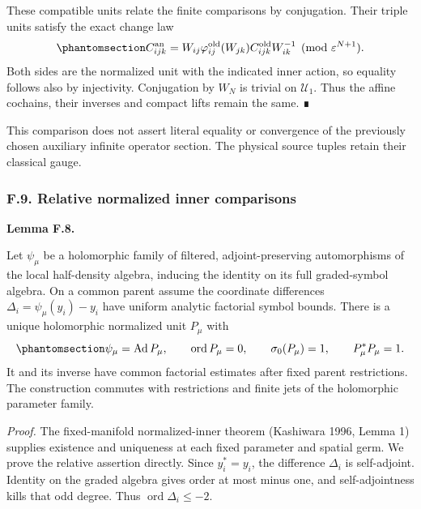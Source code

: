 \documentclass[
  english,
  11pt,
  reqno]{amsart}
\makeatletter
\newcommand{\pandocstatementheading}[1]{%
  \par\addpenalty{\@beginparpenalty}%
  \addvspace{.5\baselineskip plus .2\baselineskip minus .2\baselineskip}%
  {\normalfont\bfseries #1\par}%
  \nobreak\@afterindenttrue\@afterheading
}
\makeatother
\begin{document}
These compatible units relate the finite comparisons by conjugation.
Their triple units satisfy the exact change law
\begin{equation}\protect\phantomsection\label{eq:gg-op-analytic-finite-triple-change}{
 C^{\rm an}_{ijk}
 =W_{ij}\varphi^{\rm old}_{ij}(W_{jk})
             C^{\rm old}_{ijk}W_{ik}^{-1}
       \pmod{\varepsilon^{N+1}} .
}\end{equation} Both sides are the normalized unit with the indicated
inner action, so equality follows also by injectivity. Conjugation by
\(W_N\) is trivial on \(\mathscr U_1\). Thus the affine cochains, their
inverses and compact lifts remain the same. ∎

This comparison does not assert literal equality or convergence of the
previously chosen auxiliary infinite operator section. The physical
source tuples retain their classical gauge.

\protect{}\label{sec:gg-op-relative-inner-comparisons}

\subsubsection{F.9. Relative normalized inner
comparisons}\label{f.9.-relative-normalized-inner-comparisons}

\pandocstatementheading{\protect{}\label{lem:gg-op-relative-inner-comparisons}Lemma F.8.}

Let \(\psi_\mu\) be a holomorphic family of filtered, adjoint-preserving
automorphisms of the local half-density algebra, inducing the identity
on its full graded-symbol algebra. On a common parent assume the
coordinate differences \(\Delta_i=\psi_\mu(y_i)-y_i\) have uniform
analytic factorial symbol bounds. There is a unique holomorphic
normalized unit \(P_\mu\) with
\begin{equation}\protect\phantomsection\label{eq:gg-op-relative-inner-normalization}{
 \psi_\mu=\operatorname{Ad}P_\mu,\qquad
 \operatorname{ord}P_\mu=0,\qquad
 \sigma_0(P_\mu)=1,\qquad P_\mu^*P_\mu=1.
}\end{equation} It and its inverse have common factorial estimates after
fixed parent restrictions. The construction commutes with restrictions
and finite jets of the holomorphic parameter family.

\emph{Proof.} The fixed-manifold normalized-inner theorem (Kashiwara
1996, Lemma 1) supplies existence and uniqueness at each fixed parameter
and spatial germ. We prove the relative assertion directly. Since
\(y_i^*=y_i\), the difference \(\Delta_i\) is self-adjoint. Identity on
the graded algebra gives order at most minus one, and self-adjointness
kills that odd degree. Thus \(\operatorname{ord}\Delta_i\le-2\).
\end{document}
